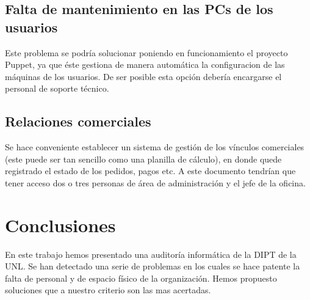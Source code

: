 \documentclass[a4paper,11pt,oneside]{article}
\begin{document}
\subsection*{Falta de mantenimiento en las PCs de los usuarios}
Este problema se podría solucionar poniendo en funcionamiento el
proyecto Puppet, ya que éste gestiona de manera automática la
configuracion de las máquinas de los usuarios.  De ser posible esta
opción debería encargarse el personal de soporte técnico.
\subsection*{Relaciones comerciales}
Se hace conveniente establecer un sistema de gestión de los vínculos
comerciales (este puede ser tan sencillo como una planilla de
cálculo), en donde quede registrado el estado de los pedidos, pagos
etc. A este documento tendrían que tener acceso dos o tres personas de
área de administración y el jefe de la oficina.

\section*{Conclusiones}
En este trabajo hemos presentado una auditoría informática de la DIPT
de la UNL. Se han detectado una serie de problemas en los cuales se
hace patente la falta de personal y de espacio físico de la
organización. Hemos propuesto soluciones que a nuestro criterio son
las mas acertadas.
\end{document}
